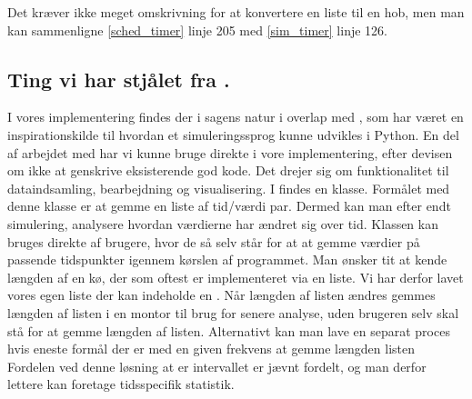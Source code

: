 Det kræver ikke meget omskrivning for at konvertere en liste til en hob, men man kan sammenligne \cref{sched_timer} linje 205 med \cref{sim_timer} linje 126. 


\subsection{Ting vi har stjålet fra \simpy.}
I vores implementering findes der i sagens natur i overlap med \simpy, som har været en inspirationskilde til hvordan et simuleringssprog kunne udvikles i Python. En del af arbejdet med \simpy har vi kunne bruge direkte i vore implementering, efter devisen om ikke at genskrive eksisterende god kode. Det drejer sig om funktionalitet til dataindsamling, bearbejdning og visualisering. I \simpy findes en klasse. Formålet med denne klasse er at gemme en liste af tid/værdi par. Dermed kan man efter endt simulering, analysere  hvordan værdierne har ændret sig over tid. Klassen  kan bruges direkte af brugere, hvor de så selv  står for at at gemme værdier på passende tidspunkter igennem kørslen af programmet. Man ønsker tit at kende længden af en kø, der som oftest er implementeret via en liste. Vi har derfor lavet vores egen liste der kan indeholde en . Når længden af listen ændres gemmes længden af listen i en montor til brug for senere analyse, uden brugeren selv skal stå for at gemme længden af listen. Alternativt kan man lave en separat proces hvis eneste formål der er med en given frekvens at gemme længden listen Fordelen ved denne løsning at er intervallet er jævnt fordelt, og man derfor lettere kan foretage tidsspecifik statistik.


